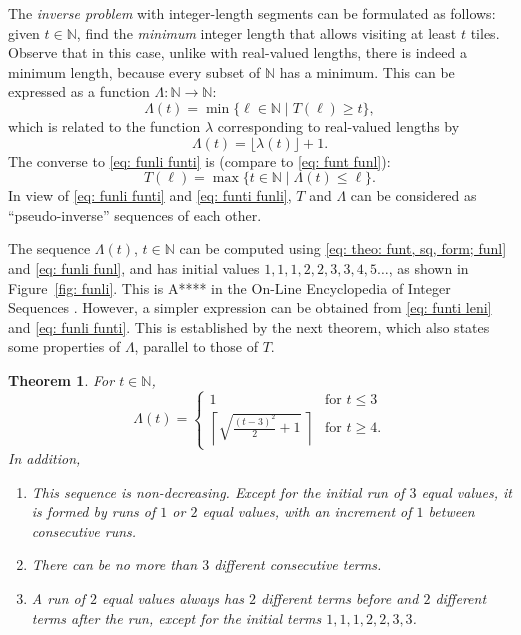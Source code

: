 \documentclass[12pt, a4paper]{article}
\newcommand{\st}{\mid}%
\newcommand{\funl}{\lambda} %
\newcommand{\funti}{T} %
\newcommand{\funli}{\Lambda} %
\newcommand{\leni}{\ell} %
\newcommand{\tiles}{t} %
\newcommand{\touching}{visiting}
\newtheorem{theorem}{Theorem}%
\begin{document}
The \emph{inverse problem} with integer-length segments can be formulated as follows: given $\tiles \in \mathbb N$, find the \emph{minimum} integer length that allows \touching{} at least $\tiles$ tiles. Observe that in this case, unlike with real-valued lengths, there is indeed a minimum length, because every subset of $\mathbb N$ has a minimum. This can be expressed as a function $\funli: \mathbb N \to \mathbb N$:
\begin{equation}
\label{eq: funli funti}
\funli(\tiles) = \min\{\leni \in \mathbb N \st \funti(\leni) \geq \tiles\},
\end{equation}
which is related to the function $\funl$ corresponding to real-valued lengths by
\begin{equation}
\label{eq: funli funl}
\funli(\tiles) = \lfloor\funl(\tiles)\rfloor + 1.
\end{equation}
The converse to \eqref{eq: funli funti} is (compare to \eqref{eq: funt funl}):
\begin{equation}
\label{eq: funti funli}
\funti(\leni) = \max \{\tiles \in \mathbb N \st \funli(\tiles) \leq \leni\}.
\end{equation}
In view of \eqref{eq: funli funti} and \eqref{eq: funti funli}, $\funti$ and $\funli$ can be considered as ``pseudo-inverse'' sequences of each other.

The sequence $\funli(\tiles)$, $\tiles \in \mathbb N$ can be computed using \eqref{eq: theo: funt, sq, form; funl} and \eqref{eq: funli funl}, and has initial values $1, 1, 1, 2, 2, 3, 3, 4, 5 \ldots$, as shown in Figure~\ref{fig: funli}. This is A**** in the On-Line Encyclopedia of Integer Sequences \cite{***}. However, a simpler expression can be obtained from \eqref{eq: funti leni} and \eqref{eq: funli funti}. This is established by the next theorem, which also states some properties of $\funli$, parallel to those of $\funti$.

\begin{theorem}
\label{theo: funli}
For $\tiles \in \mathbb N$,
\begin{equation}
\label{eq: funli}
\funli(\tiles) = \begin{cases}
\displaystyle
1 & \text{for } \tiles \leq 3 \\[1.3mm]
\displaystyle
\left \lceil \sqrt{\frac{(\tiles-3)^2} 2 + 1} \ \right \rceil & \text{for } \tiles \geq 4.
\end{cases}
\end{equation}
In addition,
\begin{enumerate}
\item
This sequence is non-decreasing. Except for the initial run of $3$ equal values, it is formed by runs of $1$ or $2$ equal values, with an increment of $1$ between consecutive runs.
\item
There can be no more than $3$ different consecutive terms.
\item
A run of $2$ equal values always has $2$ different terms before and $2$ different terms after the run, except for the initial terms $1, 1, 1, 2, 2, 3, 3$.
\end{enumerate}
\end{theorem}
\end{document}
